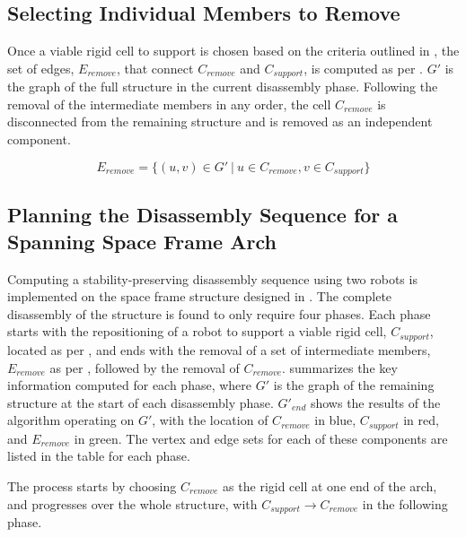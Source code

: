     
\subsection{Selecting Individual Members to Remove} \label{sec:5__remove}
    Once a viable rigid cell to support is chosen based on the criteria outlined in , the set of edges, $E_{remove}$, that connect $C_{remove}$ and $C_{support}$, is computed as per . $G'$ is the graph of the full structure in the current disassembly phase. Following the removal of the intermediate members in any order, the cell $C_{remove}$ is disconnected from the remaining structure and is removed as an independent component.

    \begin{equation}\label{eq:remove_edge}
        E_{remove} = \{(u,v) \in G' \ | \ u \in C_{remove}, v \in C_{support}\}
    \end{equation}
    

\subsection{Planning the Disassembly Sequence for a Spanning Space Frame Arch} \label{sec:5__casestudy}
    Computing a stability-preserving disassembly sequence using two robots is implemented on the space frame structure designed in . The complete disassembly of the structure is found to only require four phases. Each phase starts with the repositioning of a robot to support a viable rigid cell, $C_{support}$, located as per , and ends with the removal of a set of intermediate members, $E_{remove}$ as per , followed by the removal of $C_{remove}$.  summarizes the key information computed for each phase, where $G'$ is the graph of the remaining structure at the start of each disassembly phase. $G'_{end}$ shows the results of the algorithm operating on $G'$, with the location of $C_{remove}$ in blue, $C_{support}$ in red, and $E_{remove}$ in green. The vertex and edge sets for each of these components are listed in the table for each phase.
    
    The process starts by choosing $C_{remove}$ as the rigid cell at one end of the arch, and progresses over the whole structure, with $C_{support} \rightarrow C_{remove}$ in the following phase.

    \def\colpicwidth{0.20}
    \setcellgapes{0pt}
    
